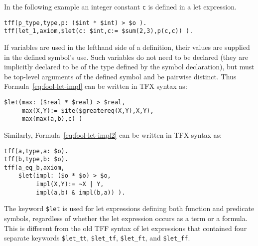 \documentclass{easychair}
\begin{document}
In the following example an integer constant {\tt c} is defined in a let expression.
\begin{verbatim}
tff(p_type,type,p: ($int * $int) > $o ).
tff(let_1,axiom,$let(c: $int,c:= $sum(2,3),p(c,c)) ).
\end{verbatim}

If variables are used in the lefthand side of a definition, their values are 
supplied in the defined symbol's use. 
Such variables do not need to be declared (they are implicitly declared to be 
of the type defined by the symbol declaration), but must be top-level arguments 
of the defined symbol and be pairwise distinct. 
Thus Formula~\ref{eq:fool-let-impl} can be written in TFX syntax as:
\begin{verbatim}
$let(max: ($real * $real) > $real,
     max(X,Y):= $ite($greatereq(X,Y),X,Y),
     max(max(a,b),c) )
\end{verbatim}


Similarly, Formula~\ref{eq:fool-let-impl2} can be written in TFX syntax as:
\begin{verbatim}
tff(a,type,a: $o).
tff(b,type,b: $o).
tff(a_eq_b,axiom,
    $let(impl: ($o * $o) > $o,
         impl(X,Y):= ~X | Y,
         impl(a,b) & impl(b,a)) ).
\end{verbatim}

The keyword \verb'$let' is used for let expressions defining both function and 
predicate symbols, regardless of whether the let expression occurs as a term 
or a formula. 
This is different from the old TFF syntax of let expressions that contained 
four separate keywords \verb'$let_tt', \verb'$let_tf', \verb'$let_ft', and 
\verb'$let_ff'.
\end{document}
